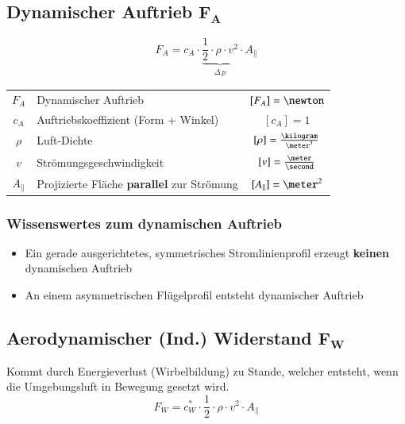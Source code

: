 \subsection[Dynamischer Auftrieb]{Dynamischer Auftrieb $\bm{F_A}$}

\vspace{-0.2cm}

\[\boxed{ F_A = c_A \cdot \underbrace{\frac{1}{2} \cdot \rho \cdot v^2 }_{\substack{\Delta \, p}} \cdot A_{\|}	} \]

\renewcommand{\arraystretch}{1.3}
\begin{tabular}{c l c}
    $F_A$       & Dynamischer Auftrieb                              & $[F_A] = \newton$                     \\
    $c_A$       & Auftriebskoeffizient (Form + Winkel)                  & $[c_A] = 1$                           \\
    $\rho$      & Luft-Dichte                                      
  & $[\rho] = \frac{\kilogram}{\meter^3}$ \\
    $v$         & Strömungsgeschwindigkeit                          & $[v] = \frac{\meter}{\second}$        \\
    $A_{\|}$    & Projizierte Fläche \textbf{parallel} zur Strömung & $[A_{\|}] = \meter^2$
\end{tabular}
\renewcommand{\arraystretch}{1}


\subsubsection{Wissenswertes zum dynamischen Auftrieb}

\begin{itemize}
    \item Ein gerade ausgerichtetes, symmetrisches Stromlinienprofil erzeugt \textbf{keinen} dynamischen Auftrieb
    \item An einem asymmetrischen Flügelprofil entsteht dynamischer Auftrieb 
\end{itemize}


\subsection[Induzierter Widerstand]{Aerodynamischer (Ind.) Widerstand $\bm{F_W}$}

Kommt durch Energieverlust (Wirbelbildung) zu Stande, welcher entsteht, wenn die Umgebungsluft in Bewegung gesetzt wird.
\[\boxed{ F_W = c^*_W \cdot \frac{1}{2} \cdot \rho \cdot v^2 \cdot A_{\|} } \]


